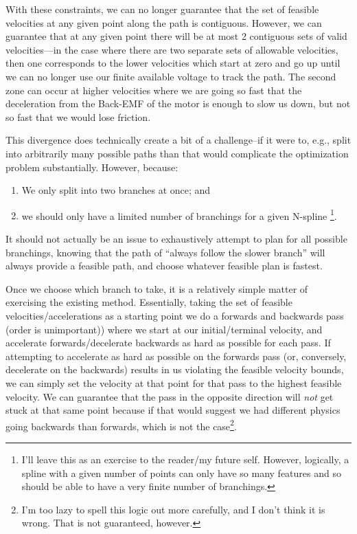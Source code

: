 \documentclass{article}
\begin{document}
With these constraints, we can no longer guarantee that the set of feasible
velocities at any given point along the path is contiguous. However, we can
guarantee that at any given point there will be at most 2 contiguous sets of
valid velocities---in the case where there are two separate sets of allowable
velocities, then one corresponds to the lower velocities which start at zero and
go up until we can no longer use our finite available voltage to track the path.
The second zone can occur at higher velocities where we are going so fast that
the deceleration from the Back-EMF of the motor is enough to slow us down, but
not so fast that we would lose friction.

This divergence does technically create a bit of a challenge--if it were to,
e.g., split into arbitrarily many possible paths than that would complicate the
optimization problem substantially. However, because:
\begin{enumerate}
\item We only split into two branches at once; and
\item we should only have a limited number of branchings for a given N-spline
\footnote{I'll leave this as an exercise to the reader/my future self. However,
logically, a spline with a given number of points can only have so many features
and so should be able to have a very finite number of branchings.}.
\end{enumerate}

It should not actually be an issue to exhaustively attempt to plan for all
possible branchings, knowing that the path of ``always follow the slower
branch'' will always provide a feasible path, and choose whatever feasible plan
is fastest.

Once we choose which branch to take, it is a relatively simple matter of
exercising the existing method. Essentially, taking the set of feasible
velocities/accelerations as a starting point we do a forwards and backwards pass
(order is unimportant)) where we start at our initial/terminal velocity, and
accelerate forwards/decelerate backwards as hard as possible for each pass. If
attempting to accelerate as hard as possible on the forwards pass (or,
conversely, decelerate on the backwards) results in us violating the feasible
velocity bounds, we can simply set the velocity at that point for that pass to
the highest feasible velocity. We can guarantee that the pass in the opposite
direction will \emph{not} get stuck at that same point because if that would
suggest we had different physics going backwards than forwards, which is not the
case\footnote{I'm too lazy to spell this logic out more carefully, and I don't
think it is wrong. That is not guaranteed, however.}.
\end{document}

